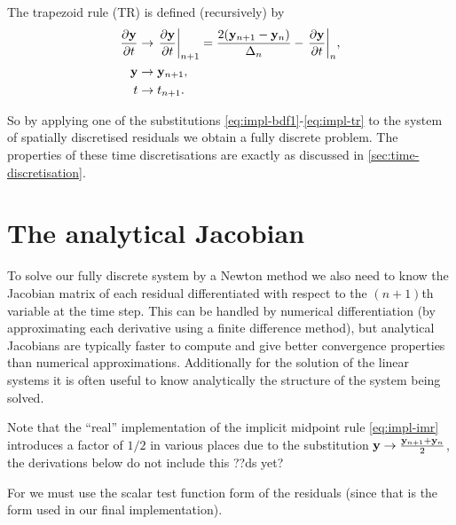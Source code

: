 The trapezoid rule (TR) is defined (recursively) by
\begin{equation}
  \begin{aligned}
    \frac{\partial \mathbf{y}}{\partial t} &\rightarrow {\left. {\frac{\partial \mathbf{y}}{\partial t}} \right|_{n+1}} 
    = \frac{2(\mathbf{y}_{n+1} - \mathbf{y}_n)}{\Delta_{n}} - {\left. {\frac{\partial \mathbf{y}}{\partial t}} \right|_{n}}, \\
    \mathbf{y} &\rightarrow \mathbf{y}_{n+1}, \\
    t &\rightarrow t_{n+1}.
    \label{eq:impl-tr}
  \end{aligned}
\end{equation}

So by applying one of the substitutions \cref{eq:impl-bdf1}-\cref{eq:impl-tr} to the system of spatially discretised residuals we obtain a fully discrete problem.
The properties of these time discretisations are exactly as discussed in \cref{sec:time-discretisation}.




\section{The analytical Jacobian}
\label{sec:llg-jacobian-calculation}

To solve our fully discrete system by a Newton method we also need to know the Jacobian matrix of each residual differentiated with respect to the $(n+1)$th variable at the time step.
This can be handled by numerical differentiation (\eg by approximating each derivative using a finite difference method), but analytical Jacobians are typically faster to compute and give better convergence properties than numerical approximations.
Additionally for the solution of the linear systems it is often useful to know analytically the structure of the system being solved.

Note that the ``real'' implementation of the implicit midpoint rule \cref{eq:impl-imr} introduces a factor of $1/2$ in various places due to the substitution $ \mathbf{y} \rightarrow \frac{\mathbf{y}_{n+1} + \mathbf{y}_n}{2}$, the derivations below do not include this ??ds yet?

For  we must use the scalar test function form of the residuals (since that is the form used in our final implementation).

